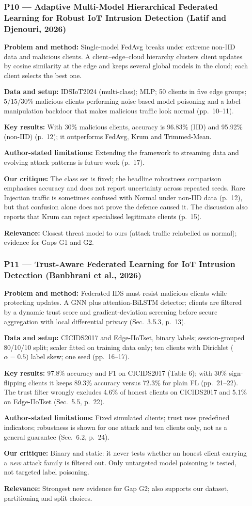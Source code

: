 \documentclass[10pt,a4paper]{article}
\newcommand{\sumitem}[2]{\noindent\textbf{#1:} #2\par}
\begin{document}
\subsubsection*{P10 --- Adaptive Multi-Model Hierarchical Federated Learning for Robust IoT Intrusion Detection (Latif and Djenouri, 2026)}
\sumitem{Problem and method}{Single-model FedAvg breaks under extreme non-IID data and malicious clients. A client--edge--cloud hierarchy clusters client updates by cosine similarity at the edge and keeps several global models in the cloud; each client selects the best one.}
\sumitem{Data and setup}{IDSIoT2024 (multi-class); MLP; 50 clients in five edge groups; 5/15/30\% malicious clients performing noise-based model poisoning and a label-manipulation backdoor that makes malicious traffic look normal (pp.~10--11).}
\sumitem{Key results}{With 30\% malicious clients, accuracy is 96.83\% (IID) and 95.92\% (non-IID) (p.~12); it outperforms FedAvg, Krum and Trimmed-Mean.}
\sumitem{Author-stated limitations}{Extending the framework to streaming data and evolving attack patterns is future work (p.~17).}
\sumitem{Our critique}{The class set is fixed; the headline robustness comparison emphasises accuracy and does not report uncertainty across repeated seeds. Rare Injection traffic is sometimes confused with Normal under non-IID data (p.~12), but that confusion alone does not prove the defence caused it. The discussion also reports that Krum can reject specialised legitimate clients (p.~15).}
\sumitem{Relevance}{Closest threat model to ours (attack traffic relabelled as normal); evidence for Gaps G1 and G2.}

\subsubsection*{P11 --- Trust-Aware Federated Learning for IoT Intrusion Detection (Banbhrani et al., 2026)}
\sumitem{Problem and method}{Federated IDS must resist malicious clients while protecting updates. A GNN plus attention-BiLSTM detector; clients are filtered by a dynamic trust score and gradient-deviation screening before secure aggregation with local differential privacy (Sec.~3.5.3, p.~13).}
\sumitem{Data and setup}{CICIDS2017 and Edge-IIoTset, binary labels; session-grouped 80/10/10 split; scaler fitted on training data only; ten clients with Dirichlet ($\alpha=0.5$) label skew; one seed (pp.~16--17).}
\sumitem{Key results}{97.8\% accuracy and F1 on CICIDS2017 (Table 6); with 30\% sign-flipping clients it keeps 89.3\% accuracy versus 72.3\% for plain FL (pp.~21--22). The trust filter wrongly excludes 4.6\% of honest clients on CICIDS2017 and 5.1\% on Edge-IIoTset (Sec.~5.5, p.~22).}
\sumitem{Author-stated limitations}{Fixed simulated clients; trust uses predefined indicators; robustness is shown for one attack and ten clients only, not as a general guarantee (Sec.~6.2, p.~24).}
\sumitem{Our critique}{Binary and static: it never tests whether an honest client carrying a \emph{new} attack family is filtered out. Only untargeted model poisoning is tested, not targeted label poisoning.}
\sumitem{Relevance}{Strongest new evidence for Gap G2; also supports our dataset, partitioning and split choices.}
\end{document}
